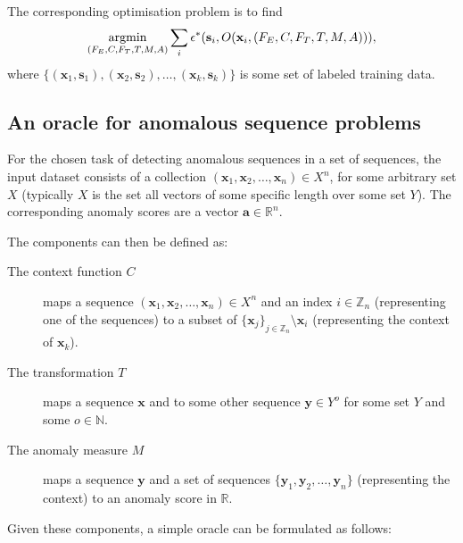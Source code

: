 The corresponding optimisation problem is to find
\[
    \argmin_{(F_E, C, F_T, T, M, A)} \sum_i \epsilon^*(\mathbf{s}_i, O(\mathbf{x}_i, (F_E, C, F_T, T, M, A))),
\]
where $\{(\mathbf{x}_1, \mathbf{s}_1), (\mathbf{x}_2, \mathbf{s}_2), \dots, (\mathbf{x}_k, \mathbf{s}_k)\}$ is some set of labeled training data.

\subsection{An oracle for anomalous sequence problems}
\label{sect:sequence_oracle}

For the chosen task of detecting anomalous sequences in a set of sequences, the input dataset consists of a collection $(\mathbf{x}_1, \mathbf{x}_2, \dots, \mathbf{x}_n) \in X^n$, for some arbitrary set $X$ (typically $X$ is the set all vectors of some specific length over some set $Y$). The corresponding anomaly scores are a vector $\mathbf{a} \in \mathbb{R}^n$.

The components can then be defined as:
\begin{description}
    \item[The context function $C$] maps a sequence $(\mathbf{x}_1, \mathbf{x}_2, \dots, \mathbf{x}_n) \in X^n$ and an index $i \in \mathbb{Z}_n$ (representing one of the sequences) to a subset of ${\{\mathbf{x}_j\}}_{j \in \mathbb{Z}_n} \setminus \mathbf{x}_i$ (representing the context of $\mathbf{x}_k$).
    \item[The transformation $T$]maps a sequence $\mathbf{x}$ and to some other sequence $\mathbf{y} \in Y^o$ for some set $Y$ and some $o \in \mathbb{N}$.
    \item[The anomaly measure $M$] maps a sequence $\mathbf{y}$ and a set of sequences $\{\mathbf{y}_1, \mathbf{y}_2, \dots, \mathbf{y}_n\}$ (representing the context) to an anomaly score in $\mathbb{R}$.
\end{description}

Given these components, a simple oracle can be formulated as follows:
\begin{algorithmic}
     
    \EndFor{}
\end{algorithmic}


